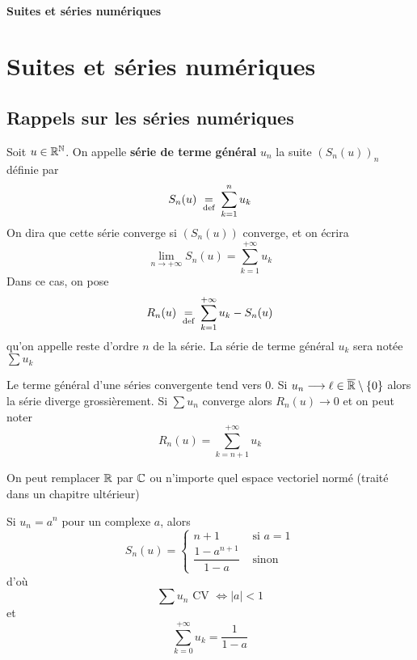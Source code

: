 \ifsolo
    ~

    \vspace{1cm}

    \begin{center}
        \textbf{\LARGE Suites et séries numériques} \\[1em]
    \end{center}
    \tableofcontents
\else
    \chapter{Suites et séries numériques}

    \minitoc
\fi
\thispagestyle{empty}

\ifsolo \newpage \setcounter{page}{1} \fi

\section{Rappels sur les séries numériques}

\begin{dfn}
    Soit $u\in\mathbb R^{\mathbb N}$. On appelle \textbf{série de terme général} $u_n$ la suite $(S_n(u))_n$ définie par \[
        S_n(u)\;\underset{\text{def}}=\; \sum_{k=1}^nu_k
    \]
    On dira que cette série converge si $(S_n(u))$ converge, et on écrira \[
        \lim_{n\to+\infty}S_n(u)=\sum_{k=1}^{+\infty}u_k
    \]
    Dans ce cas, on pose \[
        R_n(u)\;\underset{\text{def}}=\;\sum_{k=1}^{+\infty}u_k-S_n(u)
    \]
    qu'on appelle reste d'ordre $n$ de la série. La série de terme général $u_k$ sera notée $\sum u_k$
\end{dfn}


\begin{rem}
    Le terme général d'une séries convergente tend vers $0$. Si $u_n\longrightarrow \ell\in\overline{ \mathbb R}\setminus\{0\}$ alors la série diverge grossièrement. Si $\sum u_n$ converge alors $R_n(u)\longrightarrow0$ et on peut noter \[
        R_n(u)=\sum_{k=n+1}^{+\infty}u_k
    \]
\end{rem}

\begin{rem}
    On peut remplacer $\mathbb R$ par $\mathbb C$ ou n'importe quel espace vectoriel normé (traité dans un chapitre ultérieur)
\end{rem}

\begin{ex}
    Si $u_n=a^n$ pour un complexe $a$, alors \[
        S_n(u)= \begin{cases}
            n+1 &\text{ si }a=1\\[1em]
            \dfrac{1-a^{n+1}}{1-a}&\text{ sinon}
        \end{cases}
    \]
    d'où \[
        \sum u_n\text{ CV }\iff |a|<1
    \]
    et \[
        \sum_{k=0}^{+\infty}u_k=\frac1{1-a}
    \]
\end{ex}

